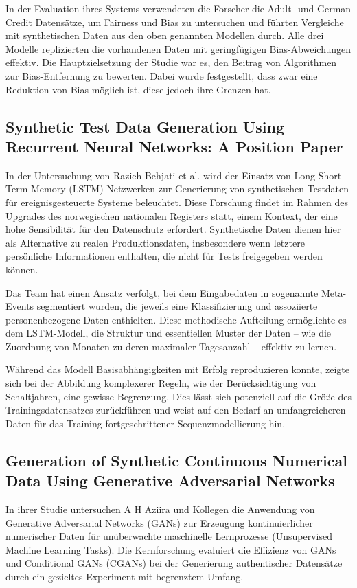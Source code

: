 In der Evaluation ihres Systems verwendeten die Forscher die Adult- und German Credit Datensätze, um Fairness und Bias zu untersuchen und führten Vergleiche mit synthetischen Daten aus den oben
genannten Modellen durch. Alle drei Modelle replizierten die vorhandenen Daten mit geringfügigen Bias-Abweichungen effektiv. Die Hauptzielsetzung der Studie war es, den Beitrag von
Algorithmen zur Bias-Entfernung zu bewerten. Dabei wurde festgestellt, dass zwar eine Reduktion von Bias möglich ist, diese jedoch ihre Grenzen hat.


\subsection{Synthetic Test Data Generation Using Recurrent Neural Networks: A Position Paper}
In der Untersuchung von Razieh Behjati et al.\cite{8823801} wird der Einsatz von Long Short-Term Memory (LSTM) Netzwerken zur Generierung von synthetischen Testdaten für ereignisgesteuerte Systeme beleuchtet.
Diese Forschung findet im Rahmen des Upgrades des norwegischen nationalen Registers statt, einem Kontext, der eine hohe Sensibilität für den Datenschutz erfordert. Synthetische Daten dienen hier als
Alternative zu realen Produktionsdaten, insbesondere wenn letztere persönliche Informationen enthalten, die nicht für Tests freigegeben werden können.

Das Team hat einen Ansatz verfolgt, bei dem Eingabedaten in sogenannte Meta-Events segmentiert wurden, die jeweils eine Klassifizierung und assoziierte personenbezogene Daten enthielten.
Diese methodische Aufteilung ermöglichte es dem LSTM-Modell, die Struktur und essentiellen Muster der Daten – wie die Zuordnung von Monaten zu deren maximaler Tagesanzahl – effektiv zu lernen.

Während das Modell Basisabhängigkeiten mit Erfolg reproduzieren konnte, zeigte sich bei der Abbildung komplexerer Regeln, wie der Berücksichtigung von Schaltjahren, eine gewisse
Begrenzung. Dies lässt sich potenziell auf die Größe des Trainingsdatensatzes zurückführen und weist auf den Bedarf an umfangreicheren Daten für das Training fortgeschrittener Sequenzmodellierung hin.


\subsection{Generation of Synthetic Continuous Numerical Data Using Generative Adversarial Networks}

In ihrer Studie untersuchen A H Aziira und Kollegen\cite{Aziira_2020} die Anwendung von Generative Adversarial Networks (GANs) zur Erzeugung kontinuierlicher numerischer Daten für unüberwachte maschinelle
Lernprozesse (Unsupervised Machine Learning Tasks). Die Kernforschung evaluiert die Effizienz von GANs und Conditional GANs (CGANs) bei der Generierung authentischer Datensätze durch ein gezieltes Experiment mit begrenztem Umfang.

